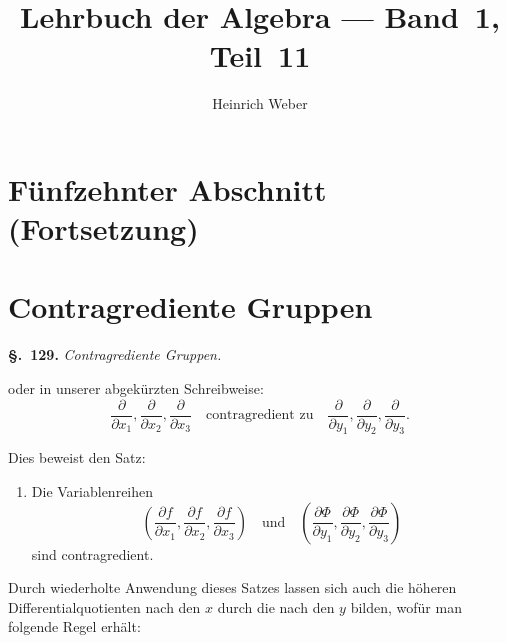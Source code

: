 \documentclass[12pt,a4paper]{article}
\title{\textbf{Lehrbuch der Algebra} --- Band~1, Teil~11}
\author{Heinrich Weber}
\date{}
\theoremstyle{definition}
\begin{document}
\maketitle
\thispagestyle{empty}

\tableofcontents
\newpage

\section*{Fünfzehnter Abschnitt (Fortsetzung)}

\section{Contragrediente Gruppen}\label{sec:129}

\noindent\textbf{\S.~129.}\quad
\textit{Contragrediente Gruppen.}

oder in unserer abgekürzten Schreibweise:
\[
\frac{\partial}{\partial x_1}, \frac{\partial}{\partial x_2}, \frac{\partial}{\partial x_3}
\quad\text{contragredient zu}\quad
\frac{\partial}{\partial y_1}, \frac{\partial}{\partial y_2}, \frac{\partial}{\partial y_3}.
\]

Dies beweist den Satz:

\begin{enumerate}[label=\arabic*.]
\item Die Variablenreihen
\[
\left(\frac{\partial f}{\partial x_1}, \frac{\partial f}{\partial x_2}, \frac{\partial f}{\partial x_3}\right)
\quad\text{und}\quad
\left(\frac{\partial\Phi}{\partial y_1}, \frac{\partial\Phi}{\partial y_2}, \frac{\partial\Phi}{\partial y_3}\right)
\]
sind contragredient.
\end{enumerate}

Durch wiederholte Anwendung dieses Satzes lassen sich auch die höheren Differentialquotienten nach den $x$ durch die nach den $y$ bilden, wofür man folgende Regel erhält:
\end{document}
